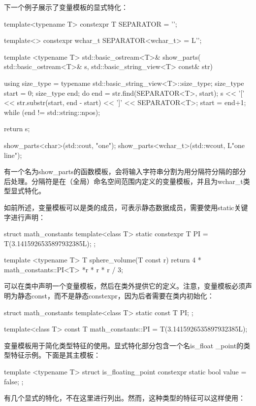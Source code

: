 下一个例子展示了变量模板的显式特化：

\begin{cpp}
template<typename T>
constexpr T SEPARATOR = '\n';

template<>
constexpr wchar_t SEPARATOR<wchar_t> = L'\n';

template <typename T>
std::basic_ostream<T>& show_parts(
	std::basic_ostream<T>& s,
	std::basic_string_view<T> const& str)
{
	using size_type =
		typename std::basic_string_view<T>::size_type;
	size_type start = 0;
	size_type end;
	do
	{
		end = str.find(SEPARATOR<T>, start);
		s << '[' << str.substr(start, end - start) << ']'
		<< SEPARATOR<T>;
		start = end+1;
	} while (end != std::string::npos);

	return s;
}

show_parts<char>(std::cout, "one\ntwo\nthree");
show_parts<wchar_t>(std::wcout, L"one line");
\end{cpp}

有一个名为show\_parts的函数模板，会将输入字符串分割为用分隔符分隔的部分后处理。分隔符是在（全局）命名空间范围内定义的变量模板，并且为wchar\_t类型显式特化。

如前所述，变量模板可以是类的成员，可表示静态数据成员，需要使用static关键字进行声明：

\begin{cpp}
struct math_constants
{
	template<class T>
	static constexpr T PI = T(3.1415926535897932385L);
};

template <typename T>
T sphere_volume(T const r)
{
	return 4 * math_constants::PI<T> *r * r * r / 3;
}
\end{cpp}

可以在类中声明一个变量模板，然后在类外提供它的定义。注意，变量模板必须声明为静态const，而不是静态constexpr，因为后者需要在类内初始化：

\begin{cpp}
struct math_constants
{
	template<class T>
	static const T PI;
};

template<class T>
const T math_constants::PI = T(3.1415926535897932385L);
\end{cpp}

变量模板用于简化类型特征的使用。显式特化部分包含一个名is\_float \_point的类型特征示例。下面是其主模板：

\begin{cpp}
template <typename T>
struct is_floating_point
{
	constexpr static bool value = false;
};
\end{cpp}

有几个显式的特化，不在这里进行列出。然而，这种类型的特征可以这样使用：

